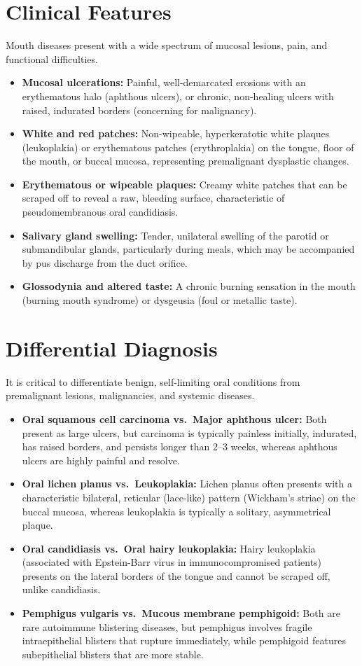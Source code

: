 \section*{Clinical Features}
Mouth diseases present with a wide spectrum of mucosal lesions, pain, and functional difficulties.
\begin{itemize}
    \item \textbf{Mucosal ulcerations:} Painful, well-demarcated erosions with an erythematous halo (aphthous ulcers), or chronic, non-healing ulcers with raised, indurated borders (concerning for malignancy).
    \item \textbf{White and red patches:} Non-wipeable, hyperkeratotic white plaques (leukoplakia) or erythematous patches (erythroplakia) on the tongue, floor of the mouth, or buccal mucosa, representing premalignant dysplastic changes.
    \item \textbf{Erythematous or wipeable plaques:} Creamy white patches that can be scraped off to reveal a raw, bleeding surface, characteristic of pseudomembranous oral candidiasis.
    \item \textbf{Salivary gland swelling:} Tender, unilateral swelling of the parotid or submandibular glands, particularly during meals, which may be accompanied by pus discharge from the duct orifice.
    \item \textbf{Glossodynia and altered taste:} A chronic burning sensation in the mouth (burning mouth syndrome) or dysgeusia (foul or metallic taste).
\end{itemize}

\section*{Differential Diagnosis}
It is critical to differentiate benign, self-limiting oral conditions from premalignant lesions, malignancies, and systemic diseases.
\begin{itemize}
    \item \textbf{Oral squamous cell carcinoma vs.\ Major aphthous ulcer:} Both present as large ulcers, but carcinoma is typically painless initially, indurated, has raised borders, and persists longer than 2--3 weeks, whereas aphthous ulcers are highly painful and resolve.
    \item \textbf{Oral lichen planus vs.\ Leukoplakia:} Lichen planus often presents with a characteristic bilateral, reticular (lace-like) pattern (Wickham's striae) on the buccal mucosa, whereas leukoplakia is typically a solitary, asymmetrical plaque.
    \item \textbf{Oral candidiasis vs.\ Oral hairy leukoplakia:} Hairy leukoplakia (associated with Epstein-Barr virus in immunocompromised patients) presents on the lateral borders of the tongue and cannot be scraped off, unlike candidiasis.
    \item \textbf{Pemphigus vulgaris vs.\ Mucous membrane pemphigoid:} Both are rare autoimmune blistering diseases, but pemphigus involves fragile intraepithelial blisters that rupture immediately, while pemphigoid features subepithelial blisters that are more stable.
\end{itemize}

